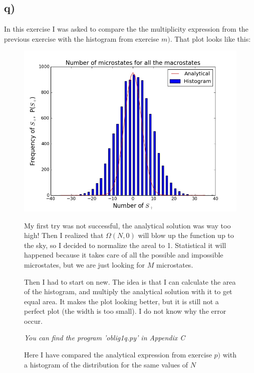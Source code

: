 \documentclass{scrartcl}
\begin{document}
\subsection*{q)}
In this exercise I was asked to compare the the multiplicity expression from the previous exercise with the histogram from exercise $m)$. That plot looks like this: 
\begin{figure}[H]
\centering
\includegraphics[width=140mm]{oblig1q1.jpg}
\caption{Here I have compared the analytical expression from exercise $p)$ with a histogram of the distribution for the same values of $N$\label{overflow}}\par\vspace{3mm}

My first try was not successful, the analytical solution was way too high! Then I realized that $\Omega(N,0)$ will blow up the function up to the sky, so I decided to normalize the areal to 1. Statistical it will happened because it takes care of all the possible and impossible microstates, but we are just looking for $M$ microstates. \par\vspace{3mm} Then I had to start on new. The idea is that I can calculate the area of the histogram, and multiply the analytical solution with it to get equal area. It makes the plot looking better, but it is still not a perfect plot (the width is too small). I do not know why the error occur.\par\vspace{3mm}
\textit{You can find the program 'oblig1q.py' in Appendix C}
\end{figure}
\end{document}
